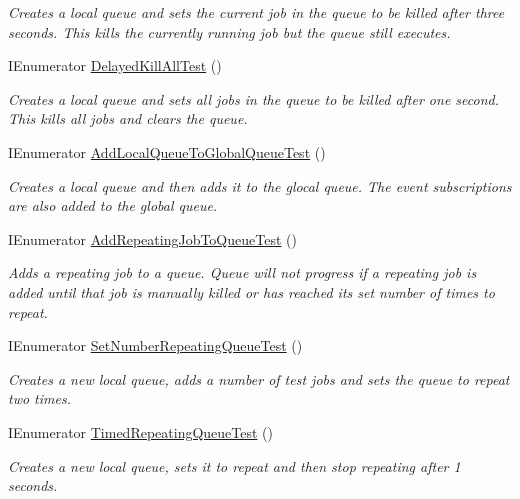 \begin{DoxyCompactItemize}
\begin{DoxyCompactList}\small\item\em Creates a local queue and sets the current job in the queue to be killed after three seconds. This kills the currently running job but the queue still executes. \end{DoxyCompactList}\item 
I\+Enumerator \hyperlink{class_example_job_queue_test_a3c5d23ccdb5c3edfd54ca39c4f93a22e}{Delayed\+Kill\+All\+Test} ()
\begin{DoxyCompactList}\small\item\em Creates a local queue and sets all jobs in the queue to be killed after one second. This kills all jobs and clears the queue. \end{DoxyCompactList}\item 
I\+Enumerator \hyperlink{class_example_job_queue_test_a628f7061c7818786b52a6b9371a1af6c}{Add\+Local\+Queue\+To\+Global\+Queue\+Test} ()
\begin{DoxyCompactList}\small\item\em Creates a local queue and then adds it to the glocal queue. The event subscriptions are also added to the global queue. \end{DoxyCompactList}\item 
I\+Enumerator \hyperlink{class_example_job_queue_test_a1ffd555683806c216251f462bb69cb40}{Add\+Repeating\+Job\+To\+Queue\+Test} ()
\begin{DoxyCompactList}\small\item\em Adds a repeating job to a queue. Queue will not progress if a repeating job is added until that job is manually killed or has reached its set number of times to repeat. \end{DoxyCompactList}\item 
I\+Enumerator \hyperlink{class_example_job_queue_test_a037cbad8b6d50077e844cb28e9412741}{Set\+Number\+Repeating\+Queue\+Test} ()
\begin{DoxyCompactList}\small\item\em Creates a new local queue, adds a number of test jobs and sets the queue to repeat two times. \end{DoxyCompactList}\item 
I\+Enumerator \hyperlink{class_example_job_queue_test_a3b7bf466ad7ad9b4039402a8fab519cf}{Timed\+Repeating\+Queue\+Test} ()
\begin{DoxyCompactList}\small\item\em Creates a new local queue, sets it to repeat and then stop repeating after 1 seconds. \end{DoxyCompactList}\item 

\end{DoxyCompactItemize}
